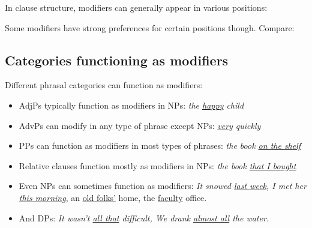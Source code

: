 In clause structure, modifiers can generally appear in various positions:

\ea\label{ex:vp-modifiers}
   \z
\z

Some modifiers have strong preferences for certain positions though. Compare:

\ea\label{ex:modifier-position}
   \z
\z{}

\subsection{Categories functioning as modifiers}

Different phrasal categories can function as modifiers:

\begin{itemize}[noitemsep]
   \item AdjPs typically function as modifiers in NPs: \textit{the \uline{happy} child}
   \item AdvPs can modify in any type of phrase except NPs: \textit{\uline{very} quickly}
   \item PPs can function as modifiers in most types of phrases: \textit{the book \uline{on the shelf}}
   \item Relative clauses function mostly as modifiers in NPs: \textit{the book \uline{that I bought}}
   \item Even NPs can sometimes function as modifiers: \textit{It snowed \uline{last week}, I met her \uline{this morning}}, an \uline{old folks'} home, the \uline{faculty} office.
   \item And DPs: \textit{It wasn't \uline{all that} difficult, We drank \uline{almost all} the water.}
\end{itemize}

